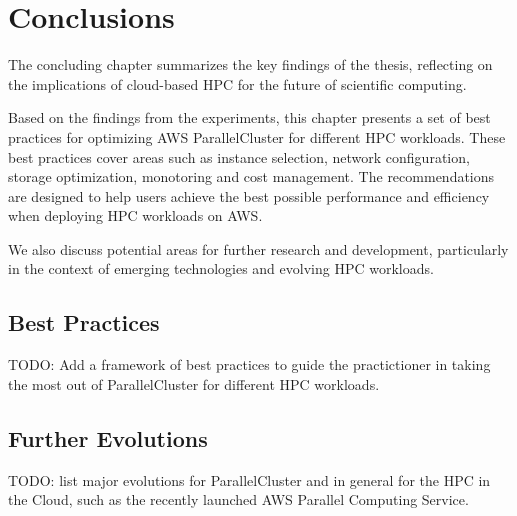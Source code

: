 

\chapter{Conclusions}

The concluding chapter summarizes the key findings of the thesis, reflecting on the implications of cloud-based HPC for the future of scientific computing. 

Based on the findings from the experiments, this chapter presents a set of best practices for optimizing AWS ParallelCluster for different HPC workloads. 
These best practices cover areas such as instance selection, network configuration, storage optimization, monotoring and cost management. 
The recommendations are designed to help users achieve the best possible performance and efficiency when deploying HPC workloads on AWS.

We also discuss potential areas for further research and development, particularly in the context of emerging technologies and evolving HPC workloads.

\section{Best Practices}

TODO: Add a framework of best practices to guide the practictioner in taking the most out of ParallelCluster for different HPC workloads.

\section{Further Evolutions}

TODO: list major evolutions for ParallelCluster and in general for the HPC in the Cloud, such as the recently launched AWS Parallel Computing Service.